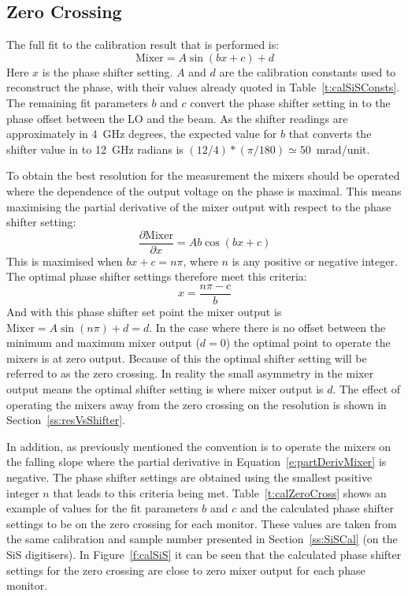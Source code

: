 \subsection{Zero Crossing}
\label{ss:calZeroCross}

The full fit to the calibration result that is performed is:
\begin{equation}
\mathrm{Mixer} = A\sin(bx + c) + d
\end{equation}
Here \(x\) is the phase shifter setting. \(A\) and \(d\) are the calibration constants used to reconstruct the phase, with their values already quoted in Table~\ref{t:calSiSConsts}. The remaining fit parameters \(b\) and \(c\) convert the phase shifter setting in to the phase offset between the LO and the beam. As the shifter readings are approximately in 4~GHz degrees, the expected value for \(b\) that converts the shifter value in to 12~GHz radians is \((12/4)*(\pi/180) \simeq 50\)~mrad/unit.

To obtain the best resolution for the measurement the mixers should be operated where the dependence of the output voltage on the phase is maximal. This means maximising the partial derivative of the mixer output with respect to the phase shifter setting:
\begin{equation}
\frac{\partial \mathrm{Mixer}}{\partial x} = Ab\cos(bx+c)
\label{e:partDerivMixer}
\end{equation}
This is maximised when \(bx + c = n\pi\), where \(n\) is any positive or negative integer. The optimal phase shifter settings therefore meet this criteria:
\begin{equation}
x = \frac{n\pi-c}{b}
\end{equation}
And with this phase shifter set point the mixer output is \(\mathrm{Mixer} = A\sin(n\pi)+d = d\). In the case where there is no offset between the minimum and maximum mixer output (\(d=0\)) the optimal point to operate the mixers is at zero output. Because of this the optimal shifter setting will be referred to as the zero crossing. In reality the small asymmetry in the mixer output means the optimal shifter setting is where mixer output is \(d\). The effect of operating the mixers away from the zero crossing on the resolution is shown in Section~\ref{ss:resVsShifter}.

In addition, as previously mentioned the convention is to operate the mixers on the falling slope where the partial derivative in Equation~\ref{e:partDerivMixer} is negative. The phase shifter settings are obtained using the smallest positive integer \(n\) that leads to this criteria being met. Table~\ref{t:calZeroCross} shows an example of values for the fit parameters \(b\) and \(c\) and the calculated phase shifter settings to be on the zero crossing for each monitor. These values are taken from the same calibration and sample number presented in Section~\ref{ss:SiSCal} (on the SiS digitisers). In Figure~\ref{f:calSiS} it can be seen that the calculated phase shifter settings for the zero crossing are close to zero mixer output for each phase monitor.

